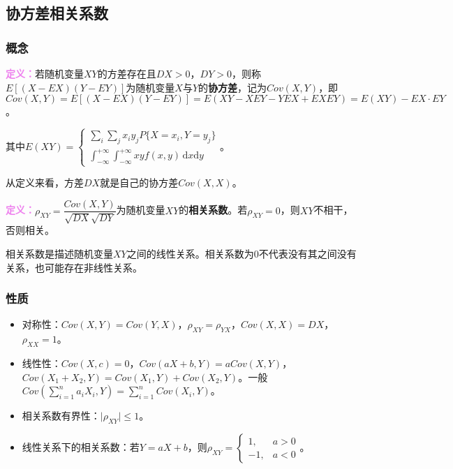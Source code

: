 \documentclass[UTF8, 12pt]{ctexart}
\begin{document}
\subsection{协方差相关系数}

\subsubsection{概念}

\textcolor{violet}{\textbf{定义：}}若随机变量$XY$的方差存在且$DX>0$，$DY>0$，则称$E[(X-EX)(Y-EY)]$为随机变量$X$与$Y$的\textbf{协方差}，记为$Cov(X,Y)$，即$Cov(X,Y)=E[(X-EX)(Y-EY)]=E(XY-XEY-YEX+EXEY)=E(XY)-EX\cdot EY$。

其中$E(XY)=\left\{\begin{array}{l}
    \sum\limits_i\sum\limits_jx_iy_jP\{X=x_i,Y=y_j\} \\
    \int_{-\infty}^{+\infty}\int_{-\infty}^{+\infty}xyf(x,y)\,\textrm{d}x\textrm{d}y
\end{array}\right.$。

从定义来看，方差$DX$就是自己的协方差$Cov(X,X)$。

\textcolor{violet}{\textbf{定义：}}$\rho_{XY}=\dfrac{Cov(X,Y)}{\sqrt{DX}\sqrt{DY}}$为随机变量$XY$的\textbf{相关系数}。若$\rho_{XY}=0$，则$XY$不相干，否则相关。

相关系数是描述随机变量$XY$之间的线性关系。相关系数为0不代表没有其之间没有关系，也可能存在非线性关系。

\subsubsection{性质}

\begin{itemize}
    \item 对称性：$Cov(X,Y)=Cov(Y,X)$，$\rho_{XY}=\rho_{YX}$，$Cov(X,X)=DX$，$\rho_{XX}=1$。
    \item 线性性：$Cov(X,c)=0$，$Cov(aX+b,Y)=aCov(X,Y)$，$Cov(X_1+X_2,Y)=Cov(X_1,Y)+Cov(X_2,Y)$。一般$Cov\left(\sum\limits_{i=1}^na_iX_i,Y\right)=\sum\limits_{i=1}^nCov(X_i,Y)$。
    \item 相关系数有界性：$\vert\rho_{XY}\vert\leqslant1$。
    \item 线性关系下的相关系数：若$Y=aX+b$，则$\rho_{XY}=\left\{\begin{array}{ll}
        1, & a>0 \\
        -1, & a<0
    \end{array}\right.$。
\end{itemize}
\end{document}
